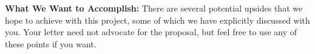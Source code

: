 \documentclass[12pt,pdftex,letterpaper]{article}
\begin{document}
\begin{itemize}
	
	
\end{itemize}

\newpage

\vspace{0.25cm}

\noindent \textbf{What We Want to Accomplish:} There are several potential upsides that we hope to achieve with this project, some of which we have explicitly discussed with you. Your letter need not advocate for the proposal, but feel free to use any of these points if you want.
\end{document}
